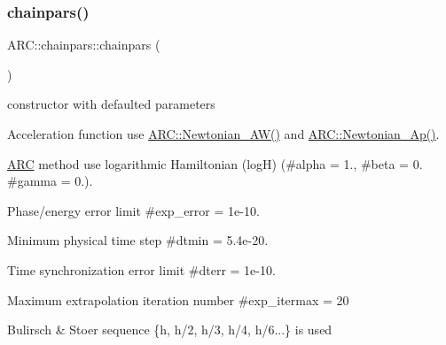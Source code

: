 \subsubsection{\texorpdfstring{chainpars()}{chainpars()}\hspace{0.1cm}{\footnotesize\ttfamily [1/2]}}
{\footnotesize\ttfamily A\+R\+C\+::chainpars\+::chainpars (\begin{DoxyParamCaption}{ }\end{DoxyParamCaption})\hspace{0.3cm}{\ttfamily [inline]}}



constructor with defaulted parameters 


\begin{DoxyItemize}
\item Acceleration function use \hyperlink{namespaceARC_ab9fc6518902e918927d8c6bd3d51401d}{A\+R\+C\+::\+Newtonian\+\_\+\+A\+W()} and \hyperlink{namespaceARC_a1010e9fd74a49633259d623839639d67}{A\+R\+C\+::\+Newtonian\+\_\+\+Ap()}.
\item \hyperlink{namespaceARC}{A\+RC} method use logarithmic Hamiltonian (logH) (\#alpha = 1., \#beta = 0. \#gamma = 0.).
\item Phase/energy error limit \#exp\+\_\+error = 1e-\/10.
\item Minimum physical time step \#dtmin = 5.\+4e-\/20.
\item Time synchronization error limit \#dterr = 1e-\/10.
\item Maximum extrapolation iteration number \#exp\+\_\+itermax = 20
\item Bulirsch \& Stoer sequence \{h, h/2, h/3, h/4, h/6...\} is used 
\end{DoxyItemize}\hypertarget{classARC_1_1chainpars_a6ae47a82b6c68f80015cec4eb51fd1c4}{}\label{classARC_1_1chainpars_a6ae47a82b6c68f80015cec4eb51fd1c4} 
